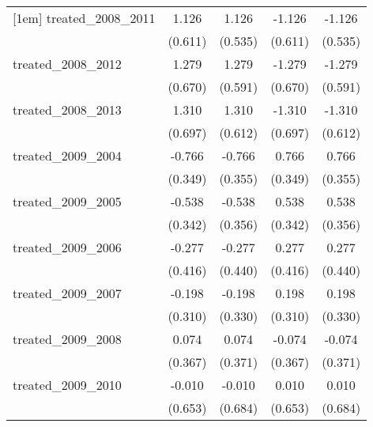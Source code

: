 {\begin{tabular}{l*{4}{c}}
[1em]
treated\_2008\_2011&       1.126         &       1.126\sym{*}  &      -1.126         &      -1.126\sym{*}  \\
            &     (0.611)         &     (0.535)         &     (0.611)         &     (0.535)         \\
[1em]
treated\_2008\_2012&       1.279         &       1.279\sym{*}  &      -1.279         &      -1.279\sym{*}  \\
            &     (0.670)         &     (0.591)         &     (0.670)         &     (0.591)         \\
[1em]
treated\_2008\_2013&       1.310         &       1.310\sym{*}  &      -1.310         &      -1.310\sym{*}  \\
            &     (0.697)         &     (0.612)         &     (0.697)         &     (0.612)         \\
[1em]
treated\_2009\_2004&      -0.766\sym{*}  &      -0.766\sym{*}  &       0.766\sym{*}  &       0.766\sym{*}  \\
            &     (0.349)         &     (0.355)         &     (0.349)         &     (0.355)         \\
[1em]
treated\_2009\_2005&      -0.538         &      -0.538         &       0.538         &       0.538         \\
            &     (0.342)         &     (0.356)         &     (0.342)         &     (0.356)         \\
[1em]
treated\_2009\_2006&      -0.277         &      -0.277         &       0.277         &       0.277         \\
            &     (0.416)         &     (0.440)         &     (0.416)         &     (0.440)         \\
[1em]
treated\_2009\_2007&      -0.198         &      -0.198         &       0.198         &       0.198         \\
            &     (0.310)         &     (0.330)         &     (0.310)         &     (0.330)         \\
[1em]
treated\_2009\_2008&       0.074         &       0.074         &      -0.074         &      -0.074         \\
            &     (0.367)         &     (0.371)         &     (0.367)         &     (0.371)         \\
[1em]
treated\_2009\_2010&      -0.010         &      -0.010         &       0.010         &       0.010         \\
            &     (0.653)         &     (0.684)         &     (0.653)         &     (0.684)         \\

\end{tabular}}
